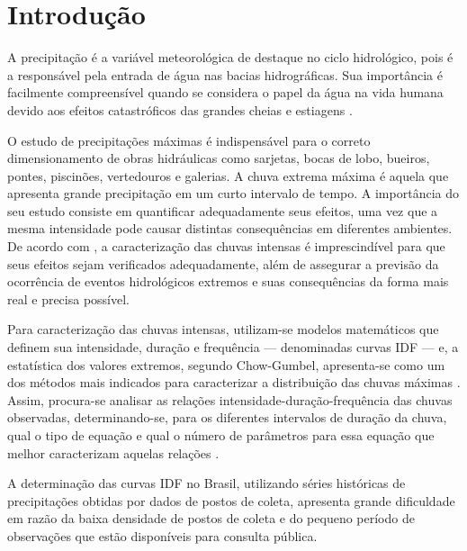 \textual

\chapter[Introdução]{Introdução}

A precipitação é a variável meteorológica de destaque no ciclo hidrológico, pois é a responsável pela entrada de água nas bacias hidrográficas. Sua importância é facilmente compreensível quando se considera o papel da água na vida humana devido aos efeitos catastróficos das grandes cheias e estiagens \cite{hidro-basica}.

O estudo de precipitações máximas é indispensável para o correto dimensionamento de obras hidráulicas como sarjetas, bocas de lobo, bueiros, pontes, piscinões, vertedouros e galerias. A chuva extrema máxima é aquela que apresenta grande precipitação em um curto intervalo de tempo. A importância do seu estudo consiste em quantificar adequadamente seus efeitos, uma vez que a mesma intensidade pode causar distintas consequências em diferentes ambientes.  De acordo com , a caracterização das chuvas intensas é imprescindível para que seus efeitos sejam verificados adequadamente, além de assegurar a previsão da ocorrência de eventos hidrológicos extremos e suas consequências da forma mais real e precisa possível.

Para caracterização das chuvas intensas, utilizam-se modelos matemáticos que definem sua intensidade, duração e frequência — denominadas curvas IDF — e, a estatística dos valores extremos, segundo Chow-Gumbel, apresenta-se como um dos métodos mais indicados para caracterizar a distribuição das chuvas máximas \cite{artigo-idf}. Assim, procura-se analisar as relações intensidade-duração-frequência das chuvas observadas, determinando-se, para os diferentes intervalos de duração da chuva, qual o tipo de equação e qual o número de parâmetros para essa equação que melhor caracterizam aquelas relações \cite{hidro-aplicada}.

A determinação das curvas IDF no Brasil, utilizando séries históricas de precipitações obtidas por dados de postos de coleta, apresenta grande dificuldade em razão da baixa densidade de postos de coleta e do pequeno período de observações que estão disponíveis para consulta pública. 

